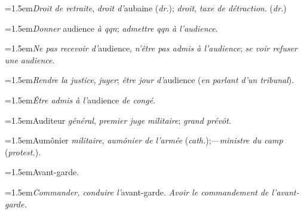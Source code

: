 \par{\dictfontsize\hangindent=1.5em\noindent \textit{Droit de retraite}, \textit{droit d’}aubaine (\textit{dr.}); \textit{droit}, \textit{taxe de détraction}. (\textit{dr.}) \par}
\par{\dictfontsize\hangindent=1.5em\noindent \textit{Donner} audience \textit{à qqn}; \textit{admettre qqn à l’audience}. \par}
\par{\dictfontsize\hangindent=1.5em\noindent \textit{Ne pas recevoir d’}audience, \textit{n’être pas admis à l’audience}; \textit{se voir refuser une audience}. \par}
\par{\dictfontsize\hangindent=1.5em\noindent \textit{Rendre la justice}, \textit{juger}; \textit{être jour d’}audience (\textit{en parlant d’un tribunal}). \par}
\par{\dictfontsize\hangindent=1.5em\noindent \textit{Être admis à l’}audience \textit{de congé}. \par}
\par{\dictfontsize\hangindent=1.5em\noindent Auditeur \textit{général}, \textit{premier juge militaire}; \textit{grand prévôt}. \par}
\par{\dictfontsize\hangindent=1.5em\noindent Aumônier \textit{militaire}, \textit{aumônier de l’armée} (\textit{cath.});—\textit{ministre du camp} (\textit{protest.}). \par}
\par{\dictfontsize\hangindent=1.5em\noindent Avant-garde. \par}
\par{\dictfontsize\hangindent=1.5em\noindent \textit{Commander, conduire l’}avant-garde. \textit{Avoir le commandement de l’avant-garde.} \par}
